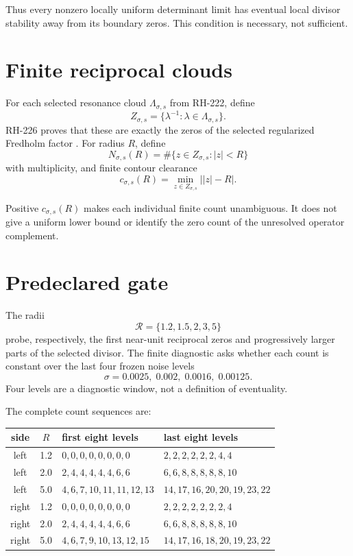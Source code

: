 \documentclass[11pt]{article}
\theoremstyle{remark}\newtheorem{remark}[theorem]{Remark}
\begin{document}
Thus every nonzero locally uniform determinant limit has eventual local
divisor stability away from its boundary zeros. This condition is necessary,
not sufficient.

\section{Finite reciprocal clouds}

For each selected resonance cloud $\Lambda_{\sigma,s}$ from RH-222, define
\[
 Z_{\sigma,s}=
 \{\lambda^{-1}:\lambda\in\Lambda_{\sigma,s}\}.
\]
RH-226 proves that these are exactly the zeros of the selected regularized
Fredholm factor \citep{WangRH226}. For radius $R$, define
\begin{equation}\label{eq:count}
 N_{\sigma,s}(R)=
 \#\{z\in Z_{\sigma,s}:|z|<R\}
\end{equation}
with multiplicity, and finite contour clearance
\begin{equation}\label{eq:clearance}
 c_{\sigma,s}(R)=
 \min_{z\in Z_{\sigma,s}}\bigl||z|-R\bigr|.
\end{equation}

Positive $c_{\sigma,s}(R)$ makes each individual finite count unambiguous. It
does not give a uniform lower bound or identify the zero count of the
unresolved operator complement.

\section{Predeclared gate}

The radii
\[
 \mathcal R=\{1.2,1.5,2,3,5\}
\]
probe, respectively, the first near-unit reciprocal zeros and progressively
larger parts of the selected divisor. The finite diagnostic asks whether
each count is constant over the last four frozen noise levels
\[
 \sigma=0.0025,\;0.002,\;0.0016,\;0.00125.
\]
Four levels are a diagnostic window, not a definition of eventuality.

The complete count sequences are:
\begin{center}
\small
\begin{tabular}{ccll}
\toprule
side & $R$ & first eight levels & last eight levels\\
\midrule
left & 1.2 & $0,0,0,0,0,0,0,0$ & $2,2,2,2,2,2,4,4$\\
left & 2.0 & $2,4,4,4,4,4,6,6$ & $6,6,8,8,8,8,8,10$\\
left & 5.0 & $4,6,7,10,11,11,12,13$ & $14,17,16,20,20,19,23,22$\\
right & 1.2 & $0,0,0,0,0,0,0,0$ & $2,2,2,2,2,2,2,4$\\
right & 2.0 & $2,4,4,4,4,4,6,6$ & $6,6,8,8,8,8,8,10$\\
right & 5.0 & $4,6,7,9,10,13,12,15$ & $14,17,16,18,20,19,23,22$\\
\bottomrule
\end{tabular}
\end{center}
\end{document}
